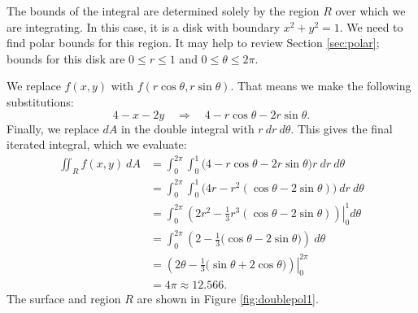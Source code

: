{The bounds of the integral are determined solely by the region $R$ over which we are integrating. In this case, it is a disk with boundary $x^2+y^2=1$. We need to find polar bounds for this region. It may help to review Section \ref{sec:polar}; bounds for this disk are $0\leq r\leq 1$ and $0\leq \theta\leq 2\pi$.

We replace $f(x,y)$ with $f(r\cos\theta,r\sin\theta)$. That means we make the following substitutions:
$$4-x-2y \quad \Rightarrow \quad 4-r\cos\theta-2r\sin\theta.$$
Finally, we replace $dA$ in the double integral with $r\ dr\ d\theta$. This gives the final iterated integral, which we evaluate:
\begin{align*}
\iint_Rf(x,y)\ dA &= \int_0^{2\pi}\int_0^1\big(4-r\cos\theta-2r\sin\theta\big)r\ dr\ d\theta\\
						&= \int_0^{2\pi}\int_0^1\big(4r-r^2(\cos\theta-2\sin\theta)\big)\ dr\ d\theta\\
						&= \int_0^{2\pi}\left.\left(2r^2-\frac13r^3(\cos\theta-2\sin\theta)\right)\right|_0^1d\theta\\
						&= \int_0^{2\pi} \left(2-\frac13\big(\cos\theta-2\sin\theta\big)\right)\ d\theta\\
						&= \left.\left(2\theta -\frac13\big(\sin\theta+2\cos\theta\big)\right)\right|_0^{2\pi} \\
						&= 4\pi \approx 12.566.
\end{align*}
The surface and region $R$ are shown in Figure \ref{fig:doublepol1}.
}\\

